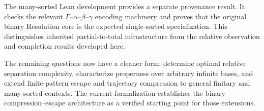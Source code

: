 The many-sorted Lean development provides a separate provenance result.  It
checks the relevant $\Gamma$--$\alpha$--$\beta$--$\gamma$ encoding machinery
and proves that the original binary Resolution core is the expected
single-sorted specialization.  This distinguishes inherited partial-to-total
infrastructure from the relative observation and completion results developed
here.

The remaining questions now have a cleaner form: determine optimal relative
separation complexity, characterize properness over arbitrary infinite bases,
and extend finite-pattern escape and trajectory compression to general finitary
and many-sorted contexts.  The current formalization establishes the binary
compression--escape architecture as a verified starting point for those
extensions.
